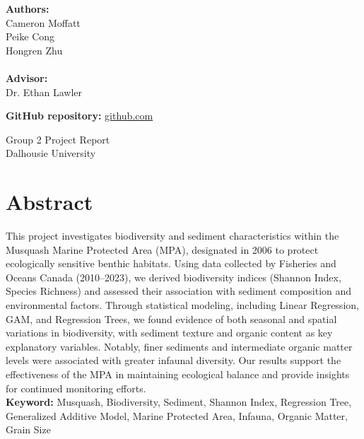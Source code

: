 \documentclass[12pt]{article}
\begin{document}
\begin{titlepage}
\vspace{2cm}
\textbf{Authors:}\\
Cameron Moffatt\\
Peike Cong\\
Hongren Zhu\\
\qquad\\
\textbf{Advisor:}\\
Dr. Ethan Lawler\\


\vspace{3 cm}


\begin{center}
\textbf{GitHub repository: } \url{github.com}
\end{center}

\vspace{3cm}
Group 2 Project Report\\
Dalhousie University

\vspace{1 cm}
\vfill
	
\end{titlepage}


\newpage
\thispagestyle{empty} %

\section*{Abstract}

\qquad This project investigates biodiversity and sediment characteristics within the Musquash Marine Protected Area (MPA), designated in 2006 to protect ecologically sensitive benthic habitats. Using data collected by Fisheries and Oceans Canada (2010–2023), we derived biodiversity indices (Shannon Index, Species Richness) and assessed their association with sediment composition and environmental factors. Through statistical modeling, including Linear Regression, GAM, and Regression Trees, we found evidence of both seasonal and spatial variations in biodiversity, with sediment texture and organic content as key explanatory variables. Notably, finer sediments and intermediate organic matter levels were associated with greater infaunal diversity. Our results support the effectiveness of the MPA in maintaining ecological balance and provide insights for continued monitoring efforts.\\

\textbf{Keyword: }Musquash, Biodiversity, Sediment, Shannon Index, Regression Tree, Generalized Additive Model, Marine Protected Area, Infauna, Organic Matter, Grain Size
\end{document}
